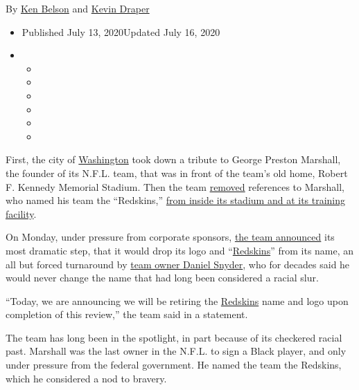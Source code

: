By \href{https://www.nytimes3xbfgragh.onion/by/ken-belson}{Ken Belson}
and \href{https://www.nytimes3xbfgragh.onion/by/kevin-draper}{Kevin
Draper}

\begin{itemize}
\item
  Published July 13, 2020Updated July 16, 2020
\item
  \begin{itemize}
  \item
  \item
  \item
  \item
  \item
  \item
  \end{itemize}
\end{itemize}

First, the city of
\href{https://www.nytimes3xbfgragh.onion/2020/07/16/style/washington-redskins-name-change-merchandise.html}{Washington}
took down a tribute to George Preston Marshall, the founder of its
N.F.L. team, that was in front of the team's old home, Robert F. Kennedy
Memorial Stadium. Then the team
\href{https://www.nytimes3xbfgragh.onion/2020/06/19/sports/baseball/statue-removed-rfk-twins.html}{removed}
references to Marshall, who named his team the ``Redskins,''
\href{https://www.nytimes3xbfgragh.onion/2020/06/24/sports/football/redskins-ring-of-fame-marshall.html?action=click\&module=RelatedLinks\&pgtype=Article}{from
inside its stadium and at its training facility}.

On Monday, under pressure from corporate sponsors,
\href{https://twitter.com/Redskins/status/1282661063943651328?s=20}{the
team announced} its most dramatic step, that it would drop its logo and
``\href{https://www.nytimes3xbfgragh.onion/2020/07/16/sports/football/washington-sexual-assault-harassment-dan-snyder.html}{Redskins}''
from its name, an all but forced turnaround by
\href{https://www.nytimes3xbfgragh.onion/2020/08/10/sports/football/washington-nfl-snyder-lawsuit.html}{team
owner Daniel Snyder}, who for decades said he would never change the
name that had long been considered a racial slur.

``Today, we are announcing we will be retiring the
\href{https://www.nytimes3xbfgragh.onion/2020/07/16/style/washington-redskins-name-change-merchandise.html}{Redskins}
name and logo upon completion of this review,'' the team said in a
statement.

The team has long been in the spotlight, in part because of its
checkered racial past. Marshall was the last owner in the N.F.L. to sign
a Black player, and only under pressure from the federal government. He
named the team the Redskins, which he considered a nod to bravery.

